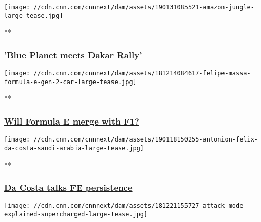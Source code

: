 \texttt{[image: //cdn.cnn.com/cnnnext/dam/assets/190131085521-amazon-jungle-large-tease.jpg]}

**

\hypertarget{blue-planet-meets-dakar-rally}{%
\subsubsection{\texorpdfstring{\href{/videos/sports/2019/01/31/alejandro-agag-extreme-e-formula-e-fia-electric-racing-supercharged-spt-intl.cnn}{'Blue
Planet meets Dakar
Rally'}}{'Blue Planet meets Dakar Rally'}}\label{blue-planet-meets-dakar-rally}}

\href{/videos/sports/2019/01/28/formula-e-merging-with-formula-one-f1-will-it-happen-supercharged-vision-spt-intl.cnn}{}

\texttt{[image: //cdn.cnn.com/cnnnext/dam/assets/181214084617-felipe-massa-formula-e-gen-2-car-large-tease.jpg]}

**

\hypertarget{will-formula-e-merge-with-f1}{%
\subsubsection{\texorpdfstring{\href{/videos/sports/2019/01/28/formula-e-merging-with-formula-one-f1-will-it-happen-supercharged-vision-spt-intl.cnn}{Will
Formula E merge with
F1?}}{Will Formula E merge with F1?}}\label{will-formula-e-merge-with-f1}}

\href{/videos/sports/2019/01/21/antonio-felix-da-costa-formula-e-bmw-andretti-season-struggles-supercharged-vision-spt-intl.cnn}{}

\texttt{[image: //cdn.cnn.com/cnnnext/dam/assets/190118150255-antonion-felix-da-costa-saudi-arabia-large-tease.jpg]}

**

\hypertarget{da-costa-talks-fe-persistence}{%
\subsubsection{\texorpdfstring{\href{/videos/sports/2019/01/21/antonio-felix-da-costa-formula-e-bmw-andretti-season-struggles-supercharged-vision-spt-intl.cnn}{Da
Costa talks FE
persistence}}{Da Costa talks FE persistence}}\label{da-costa-talks-fe-persistence}}

\href{/videos/sports/2018/12/21/formula-e-attack-mode-season-five-explainer-supercharged-vision-spt-intl.cnn}{}

\texttt{[image: //cdn.cnn.com/cnnnext/dam/assets/181221155727-attack-mode-explained-supercharged-large-tease.jpg]}

